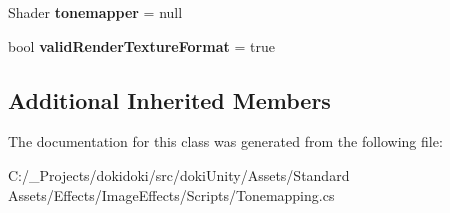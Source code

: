\begin{DoxyCompactItemize}
\item 
Shader {\bfseries tonemapper} = null\hypertarget{class_unity_standard_assets_1_1_image_effects_1_1_tonemapping_a81b4dff40a21bcaf1e409b5b2889549f}{}\label{class_unity_standard_assets_1_1_image_effects_1_1_tonemapping_a81b4dff40a21bcaf1e409b5b2889549f}

\item 
bool {\bfseries valid\+Render\+Texture\+Format} = true\hypertarget{class_unity_standard_assets_1_1_image_effects_1_1_tonemapping_a02b5dd547ece5aefb8a9ed3348b55fed}{}\label{class_unity_standard_assets_1_1_image_effects_1_1_tonemapping_a02b5dd547ece5aefb8a9ed3348b55fed}

\end{DoxyCompactItemize}
\subsection*{Additional Inherited Members}


The documentation for this class was generated from the following file\+:\begin{DoxyCompactItemize}
\item 
C\+:/\+\_\+\+Projects/dokidoki/src/doki\+Unity/\+Assets/\+Standard Assets/\+Effects/\+Image\+Effects/\+Scripts/Tonemapping.\+cs\end{DoxyCompactItemize}
